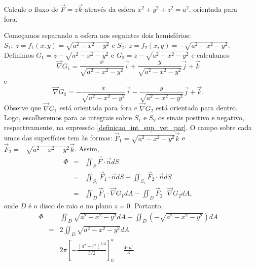 \begin{resol}
\begin{itemize}
 
 \end{itemize}

\end{resol}

\begin{exeresol} Calcule o fluxo de $\vec{F}=z\vec{k}$ através da esfera $x^2+y^2+z^2= a^2$, orientada para fora. \end{exeresol}
\begin{resol}
Começamos separando a esfera nos seguintes dois hemisférios: $S_1:\ \!z=f_1(x,y)=\sqrt{ a^2-x^2-y^2}$ e $S_2:\ \!z=f_2(x,y)=-\sqrt{ a^2-x^2-y^2}$. Definimos $G_1=z-\sqrt{ a^2-x^2-y^2}$ e $G_2=z-\sqrt{ a^2-x^2-y^2}$ e calculamos 
$$
\vec{\nabla}G_1=\frac{x}{\sqrt{a^2-x^2-y^2}}\vec{i}+\frac{y}{\sqrt{a^2-x^2-y^2}}\vec{j}+\vec{k}
$$
e 
$$
\vec{\nabla}G_2=-\frac{x}{\sqrt{a^2-x^2-y^2}}\vec{i}-\frac{y}{\sqrt{a^2-x^2-y^2}}\vec{j}+\vec{k}.
$$
Observe que $\vec{\nabla}G_1$ está orientada para fora e $\vec{\nabla}G_2$ está orientada para dentro. Logo, escolheremos para as integrais sobre $S_1$ e $S_2$ os sinais positivo e negativo, respectivamente, na expressão \eqref{definicao_int_sup_vet_par}. O campo sobre cada umas das superfícies tem às formas: $\vec{F}_1=\sqrt{ a^2-x^2-y^2}\vec{k}$ e $\vec{F}_2=-\sqrt{ a^2-x^2-y^2}\vec{k}$. Assim,
\begin{eqnarray*}
 \Phi&=&\iint_S\vec{F}\cdot \vec{n}dS\\
 &=&\iint_{S_1}\vec{F}_1\cdot \vec{n}dS+\iint_{S_2}\vec{F}_2\cdot \vec{n}dS\\
&=&\iint_{D}\vec{F}_1\cdot \vec{\nabla}G_1 dA-\iint_{D}\vec{F}_2\cdot \vec{\nabla}G_2 dA,
 \end{eqnarray*}
onde $D$ é o disco de raio $a$ no plano $z=0$. Portanto,
\begin{eqnarray*}
 \Phi&=&\iint_{D}\sqrt{ a^2-x^2-y^2} dA-\iint_{D}(-\sqrt{ a^2-x^2-y^2}) dA\\
 &=&2\iint_{D}\sqrt{ a^2-x^2-y^2} dA\\
 &=&2\pi \left[- \frac{(a^2-r^2)^{3/2}}{3/2}\right]_{0}^a=\frac{4\pi a^3}{3}.\\
 \end{eqnarray*}
\end{resol}

